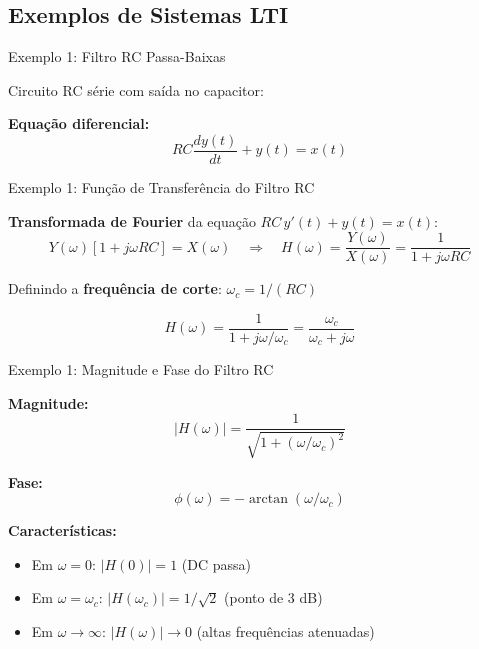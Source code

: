 
\subsection{Exemplos de Sistemas LTI}

\begin{frame}{Exemplo 1: Filtro RC Passa-Baixas}

Circuito RC série com saída no capacitor:

\begin{center}
\end{center}

\textbf{Equação diferencial:}
\[
RC\frac{dy(t)}{dt} + y(t) = x(t)
\]

\end{frame}


\begin{frame}{Exemplo 1: Função de Transferência do Filtro RC}

\textbf{Transformada de Fourier} da equação $RC\,y'(t) + y(t) = x(t)$:
\[
Y(\omega)[1 + j\omega RC] = X(\omega) \quad \Rightarrow \quad H(\omega) = \frac{Y(\omega)}{X(\omega)} = \frac{1}{1 + j\omega RC}
\]

Definindo a \textbf{frequência de corte}: $\omega_c = 1/(RC)$

\[
H(\omega) = \frac{1}{1 + j\omega/\omega_c} = \frac{\omega_c}{\omega_c + j\omega}
\]

\end{frame}


\begin{frame}{Exemplo 1: Magnitude e Fase do Filtro RC}

\textbf{Magnitude:}
\[
|H(\omega)| = \frac{1}{\sqrt{1 + (\omega/\omega_c)^2}}
\]

\textbf{Fase:}
\[
\phi(\omega) = -\arctan(\omega/\omega_c)
\]

\textbf{Características:}
\begin{itemize}
\item Em $\omega = 0$: $|H(0)| = 1$ (DC passa)
\item Em $\omega = \omega_c$: $|H(\omega_c)| = 1/\sqrt{2}$ (ponto de 3 dB)
\item Em $\omega \to \infty$: $|H(\omega)| \to 0$ (altas frequências atenuadas)
\end{itemize}

\end{frame}

